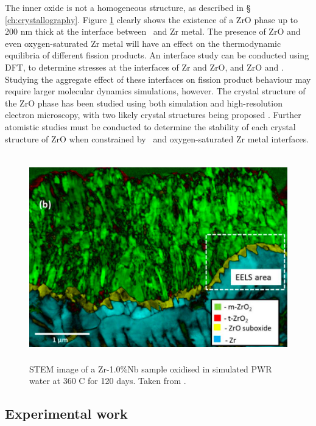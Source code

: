 The inner oxide is not a homogeneous structure, as described in § \ref{ch:crystallography}. Figure \ref{fig:zro_interface} clearly shows the existence of a ZrO phase up to 200 nm thick at the interface between \zirconia\ and Zr metal. The presence of ZrO and even oxygen-saturated Zr metal will have an effect on the thermodynamic equilibria of different fission products. An interface study can be conducted using DFT, to determine stresses at the interfaces of Zr and ZrO, and ZrO and \zirconia . Studying the aggregate effect of these interfaces on fission product behaviour may require larger molecular dynamics simulations, however. The crystal structure of the ZrO phase has been studied using both simulation and high-resolution electron microscopy, with two likely crystal structures being proposed \cite{Nicholls2015}. Further atomistic studies must be conducted to determine the stability of each crystal structure of ZrO when constrained by \zirconia\ and oxygen-saturated Zr metal interfaces.

\begin{figure}[ht] %
    \centering
    \includegraphics[height=9cm]{images/zro_interface.png}
    \caption[STEM image of a Zr-1.0\%Nb sample oxidised in simulated PWR water at 360 C for 120 days.]{STEM image of a Zr-1.0\%Nb sample oxidised in simulated PWR water at 360 C for 120 days. Taken from \cite{inproceedings}.}
    \label{fig:zro_interface}
\end{figure}

\subsection{Experimental work}

